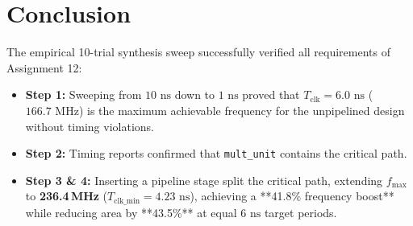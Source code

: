 \documentclass[12pt,a4paper]{article}
\begin{document}
\section{Conclusion}

The empirical 10-trial synthesis sweep successfully verified all requirements of Assignment 12:
\begin{itemize}
  \item \textbf{Step 1:} Sweeping from $10\text{ ns}$ down to $1\text{ ns}$ proved that $T_{\text{clk}} = 6.0\text{ ns}$ ($166.7\text{ MHz}$) is the maximum achievable frequency for the unpipelined design without timing violations.
  \item \textbf{Step 2:} Timing reports confirmed that \texttt{mult\_unit} contains the critical path.
  \item \textbf{Step 3 \& 4:} Inserting a pipeline stage split the critical path, extending $f_{\text{max}}$ to \textbf{236.4\,MHz} ($T_{\text{clk\_min}} = 4.23\text{ ns}$), achieving a **41.8\% frequency boost** while reducing area by **43.5\%** at equal $6\text{ ns}$ target periods.
\end{itemize}
\end{document}
